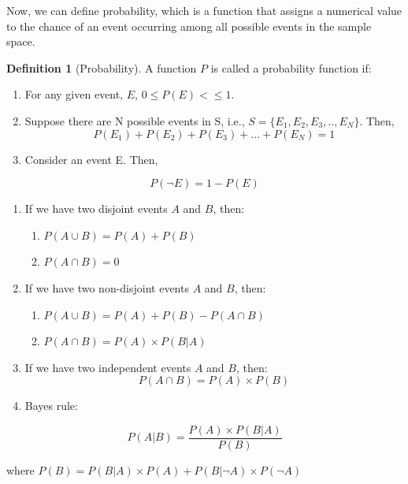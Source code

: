 \documentclass[
]{book}
\providecommand{\tightlist}{%
  \setlength{\itemsep}{0pt}\setlength{\parskip}{0pt}}
\theoremstyle{definition}
\newtheorem{definition}{Definition}[chapter]
\theoremstyle{definition}
\theoremstyle{definition}
\theoremstyle{definition}
\theoremstyle{remark}
\begin{document}
Now, we can define probability, which is a function that assigns a numerical value to the chance of an event occurring among all possible events in the sample space.

\begin{definition}[Probability]
\protect\hypertarget{def:unnamed-chunk-69}{}\label{def:unnamed-chunk-69}A function \(P\) is called a probability function if:

\begin{enumerate}
\def\labelenumi{\arabic{enumi}.}
\tightlist
\item
  For any given event, \(E\), \(0 \leq P(E)< \leq 1\).
\item
  Suppose there are N possible events in S, i.e., \(S=\{E_1, E_2, E_3,..,E_N\}\). Then,
  \[P(E_1)+P(E_2)+P(E_3)+...+P(E_N)=1\]
\item
  Consider an event E. Then,
\end{enumerate}

\[P(\lnot E) = 1 -P(E) \]

\begin{enumerate}
\def\labelenumi{\arabic{enumi}.}
\setcounter{enumi}{2}
\item
  If we have two disjoint events \(A\) and \(B\), then:

  \begin{enumerate}
  \def\labelenumii{\alph{enumii}.}
  \tightlist
  \item
    \(P(A \cup B)= P(A) + P(B)\)
  \item
    \(P(A \cap B)=0\)
  \end{enumerate}
\item
  If we have two non-disjoint events \(A\) and \(B\), then:

  \begin{enumerate}
  \def\labelenumii{\alph{enumii}.}
  \tightlist
  \item
    \(P(A \cup B)= P(A) + P(B)-P(A \cap B)\)
  \item
    \(P(A \cap B)= P(A) \times P(B|A)\)
  \end{enumerate}
\item
  If we have two independent events \(A\) and \(B\), then:
  \[P(A \cap B) = P(A) \times P(B)\]
\item
  Bayes rule:
\end{enumerate}

\[P(A|B)=\frac{P(A) \times P(B|A)}{P(B)}\]

where \(\displaystyle{P(B)= P(B|A)\times P(A) + P(B|\lnot A) \times P(\lnot A)}\)
\end{definition}
\end{document}
